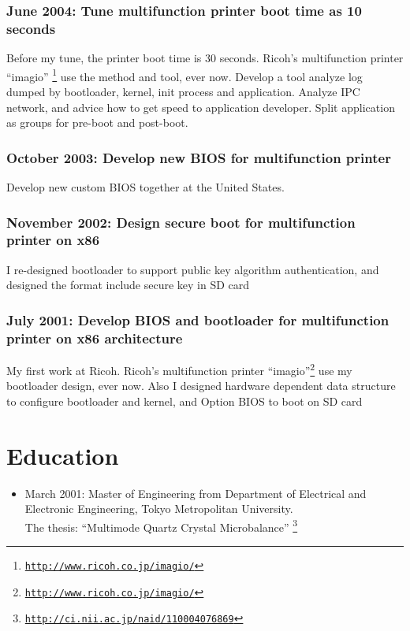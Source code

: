 \documentclass[letterpaper]{article}
\begin{document}
\subsubsection*{June 2004: Tune multifunction printer boot time as 10 seconds}
Before my tune, the printer boot time is 30 seconds.
Ricoh's multifunction printer ``imagio''
\footnote{\href{http://www.ricoh.co.jp/imagio/}{\tt http://www.ricoh.co.jp/imagio/}}
use the method and tool, ever now.
Develop a tool analyze log dumped by bootloader, kernel, init process and application.
Analyze IPC network, and advice how to get speed to application developer.
Split application as groups for pre-boot and post-boot.

\subsubsection*{October 2003: Develop new BIOS for multifunction printer}
Develop new custom BIOS together at the United States.

\subsubsection*{November 2002: Design secure boot for multifunction printer on x86}
I re-designed bootloader to support public key algorithm authentication,
and designed the format include secure key in SD card

\subsubsection*{July 2001: Develop BIOS and bootloader for multifunction printer on x86 architecture}
My first work at Ricoh. Ricoh's multifunction printer
``imagio''\footnote{\href{http://www.ricoh.co.jp/imagio/}{\tt http://www.ricoh.co.jp/imagio/}}
use my bootloader design, ever now.
Also I designed hardware dependent data structure to configure bootloader and kernel,
and Option BIOS to boot on SD card

\section*{Education}

\begin{itemize}
  \item March 2001: Master of Engineering from Department of Electrical and Electronic Engineering, Tokyo Metropolitan University. \\
    The thesis: ``Multimode Quartz Crystal Microbalance''
    \footnote{\href{http://ci.nii.ac.jp/naid/110004076869}{\tt http://ci.nii.ac.jp/naid/110004076869}}
\end{itemize}
\end{document}
